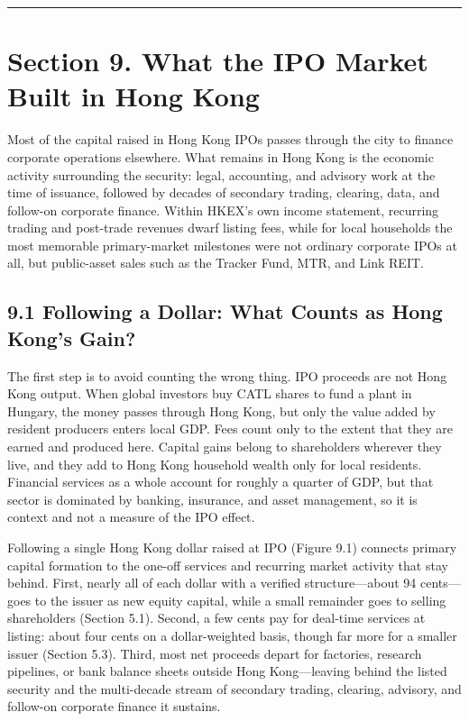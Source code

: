 \documentclass[11pt,letterpaper]{article}
\begin{document}
\par\medskip\noindent\rule{\linewidth}{0.35pt}\par\medskip
\section*{\texorpdfstring{Section 9. What the IPO Market Built in Hong Kong}{Section 9. What the IPO Market Built in Hong Kong}}
Most of the capital raised in Hong Kong IPOs passes through the city to finance corporate operations elsewhere. What remains in Hong Kong is the economic activity surrounding the security: legal, accounting, and advisory work at the time of issuance, followed by decades of secondary trading, clearing, data, and follow-on corporate finance. Within HKEX's own income statement, recurring trading and post-trade revenues dwarf listing fees, while for local households the most memorable primary-market milestones were not ordinary corporate IPOs at all, but public-asset sales such as the Tracker Fund, MTR, and Link REIT.

\subsection*{\texorpdfstring{9.1 Following a Dollar: What Counts as Hong Kong's Gain?}{9.1 Following a Dollar: What Counts as Hong Kong's Gain?}}
The first step is to avoid counting the wrong thing. IPO proceeds are not Hong Kong output. When global investors buy CATL shares to fund a plant in Hungary, the money passes through Hong Kong, but only the value added by resident producers enters local GDP. Fees count only to the extent that they are earned and produced here. Capital gains belong to shareholders wherever they live, and they add to Hong Kong household wealth only for local residents. Financial services as a whole account for roughly a quarter of GDP, but that sector is dominated by banking, insurance, and asset management, so it is context and not a measure of the IPO effect.

Following a single Hong Kong dollar raised at IPO (Figure 9.1) connects primary capital formation to the one-off services and recurring market activity that stay behind. First, nearly all of each dollar with a verified structure—about 94 cents—goes to the issuer as new equity capital, while a small remainder goes to selling shareholders (Section 5.1). Second, a few cents pay for deal-time services at listing: about four cents on a dollar-weighted basis, though far more for a smaller issuer (Section 5.3). Third, most net proceeds depart for factories, research pipelines, or bank balance sheets outside Hong Kong—leaving behind the listed security and the multi-decade stream of secondary trading, clearing, advisory, and follow-on corporate finance it sustains.
\end{document}
